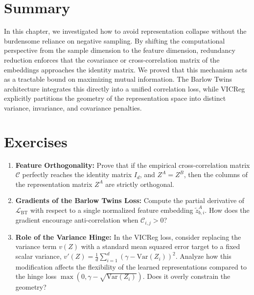 \section{Summary}
In this chapter, we investigated how to avoid representation collapse without the burdensome reliance on negative sampling. By shifting the computational perspective from the sample dimension to the feature dimension, redundancy reduction enforces that the covariance or cross-correlation matrix of the embeddings approaches the identity matrix. We proved that this mechanism acts as a tractable bound on maximizing mutual information. The Barlow Twins architecture integrates this directly into a unified correlation loss, while VICReg explicitly partitions the geometry of the representation space into distinct variance, invariance, and covariance penalties.

\section{Exercises}
\begin{enumerate}
    \item \textbf{Feature Orthogonality:} Prove that if the empirical cross-correlation matrix $\mathcal{C}$ perfectly reaches the identity matrix $I_d$, and $Z^A = Z^B$, then the columns of the representation matrix $Z^A$ are strictly orthogonal. 
    \item \textbf{Gradients of the Barlow Twins Loss:} Compute the partial derivative of $\mathcal{L}_{\text{BT}}$ with respect to a single normalized feature embedding $\tilde{z}^A_{b,i}$. How does the gradient encourage anti-correlation when $\mathcal{C}_{i,j} > 0$?
    \item \textbf{Role of the Variance Hinge:} In the VICReg loss, consider replacing the variance term $v(Z)$ with a standard mean squared error target to a fixed scalar variance, $v'(Z) = \frac{1}{d} \sum_{i=1}^d (\gamma - \text{Var}(Z_i))^2$. Analyze how this modification affects the flexibility of the learned representations compared to the hinge loss $\max(0, \gamma - \sqrt{\text{Var}(Z_i)})$. Does it overly constrain the geometry?
\end{enumerate}

